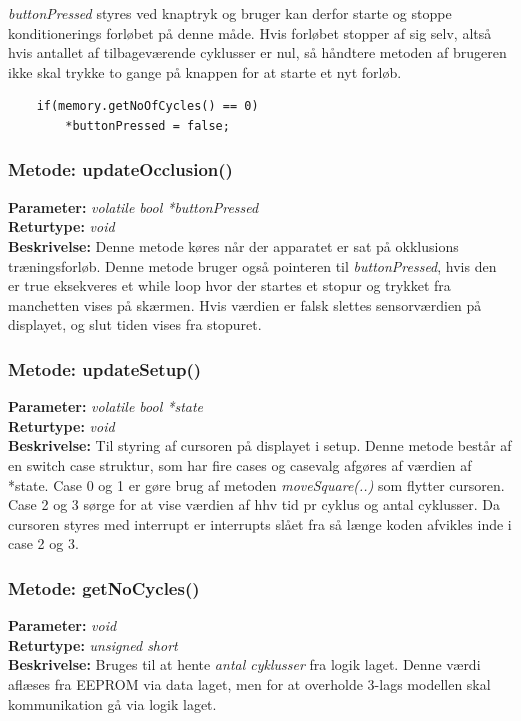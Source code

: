 \textit{buttonPressed} styres ved knaptryk og bruger kan derfor starte og stoppe konditionerings forløbet på denne måde. Hvis forløbet stopper af sig selv, altså hvis antallet af tilbageværende cyklusser er nul, så håndtere metoden af brugeren ikke skal trykke to gange på knappen for at starte et nyt forløb. 
\begin{lstlisting}
	if(memory.getNoOfCycles() == 0)
		*buttonPressed = false;
\end{lstlisting}

\subsubsection{Metode: updateOcclusion()}
\textbf{Parameter: } \textit{volatile bool *buttonPressed}
\\ \textbf{Returtype: } \textit{void}
\\ \textbf{Beskrivelse: } Denne metode køres når der apparatet er sat på okklusions træningsforløb. Denne metode bruger også pointeren til \textit{buttonPressed}, hvis den er true eksekveres et while loop hvor der startes et stopur og trykket fra manchetten vises på skærmen. Hvis værdien er falsk slettes sensorværdien på displayet, og slut tiden vises fra stopuret.

\subsubsection{Metode: updateSetup()}
\textbf{Parameter: } \textit{volatile bool *state}
\\ \textbf{Returtype: } \textit{void}
\\ \textbf{Beskrivelse: } Til styring af cursoren på displayet i setup. Denne metode består af en switch case struktur, som har fire cases og casevalg afgøres af værdien af *state. Case 0 og 1 er gøre brug af metoden \textit{moveSquare(..)} som flytter cursoren. Case 2 og 3 sørge for at vise værdien af hhv tid pr cyklus og antal cyklusser. Da cursoren styres med interrupt er interrupts slået fra så længe koden afvikles inde i case 2 og 3. 

\subsubsection{Metode: getNoCycles()}
\textbf{Parameter: } \textit{void}
\\ \textbf{Returtype: } \textit{unsigned short}
\\ \textbf{Beskrivelse: } Bruges til at hente \textit{antal cyklusser} fra logik laget. Denne værdi aflæses fra EEPROM via data laget, men for at overholde 3-lags modellen skal kommunikation gå via logik laget. 

